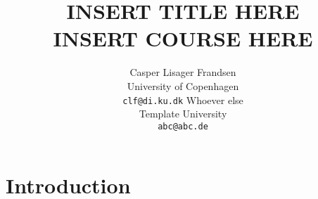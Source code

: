 \documentclass{article}
\title{
  INSERT TITLE HERE\\
  INSERT COURSE HERE
}
\author{Casper Lisager Frandsen\\
  University of Copenhagen\\
  \texttt{clf@di.ku.dk}
  \AND           %
  Whoever else\\
  Template University\\
  \texttt{abc@abc.de}
}
\begin{document}
\maketitle


\section{Introduction}





%
%
\end{document}
